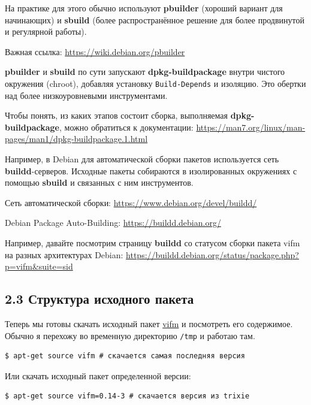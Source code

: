 На практике для этого обычно используют \textbf{pbuilder} (хороший вариант для
начинающих) и \textbf{sbuild} (более распространённое решение для более
продвинутой и регулярной работы).

Важная ссылка: \url{https://wiki.debian.org/pbuilder}

\textbf{pbuilder} и \textbf{sbuild} по сути запускают \textbf{dpkg-buildpackage}
внутри чистого окружения (chroot), добавляя установку \texttt{Build-Depends} и
изоляцию. Это обертки над более низкоуровневыми инструментами.

Чтобы понять, из каких этапов состоит сборка, выполняемая
\textbf{dpkg-buildpackage}, можно обратиться к документации:
\url{https://man7.org/linux/man-pages/man1/dpkg-buildpackage.1.html}

Например, в Debian для автоматической сборки пакетов используется сеть
\textbf{buildd}-серверов. Исходные пакеты собираются в изолированных окружениях
с помощью \textbf{sbuild} и связанных с ним инструментов.

Сеть автоматической сборки: \url{https://www.debian.org/devel/buildd/}

Debian Package Auto-Building: \url{https://buildd.debian.org/}

Например, давайте посмотрим страницу \textbf{buildd} со статусом сборки пакета
vifm на разных архитектурах Debian:
\url{https://buildd.debian.org/status/package.php?p=vifm&suite=sid}

\vspace{-0.5cm}
\subsection*{\textbf{2.3 Структура исходного пакета}}
\vspace{-0.5cm}

Теперь мы готовы скачать исходный пакет
\href{https://tracker.debian.org/pkg/vifm}{vifm} и посмотреть его содержимое.
Обычно я перехожу во временную директорию \texttt{/tmp} и работаю там.
\vspace{-0.5cm}
\begin{verbatim}
$ apt-get source vifm # скачается самая последняя версия
\end{verbatim}

\vspace{-0.3cm}
Или скачать исходный пакет определенной версии:
\vspace{-0.5cm}
\begin{verbatim}
$ apt-get source vifm=0.14-3 # скачается версия из trixie
\end{verbatim}

